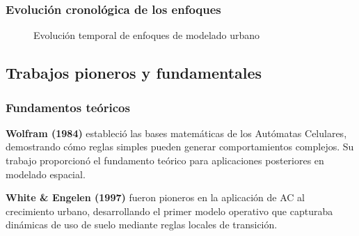 \subsubsection{Evolución cronológica de los enfoques}

\begin{figure}[h]
\centering
{}
\caption{Evolución temporal de enfoques de modelado urbano}
\label{fig:evolution_timeline}
\end{figure}

\subsection{Trabajos pioneros y fundamentales}

\subsubsection{Fundamentos teóricos}

\textbf{Wolfram (1984)} estableció las bases matemáticas de los Autómatas Celulares, demostrando cómo reglas simples pueden generar comportamientos complejos. Su trabajo proporcionó el fundamento teórico para aplicaciones posteriores en modelado espacial.

\textbf{White \& Engelen (1997)} fueron pioneros en la aplicación de AC al crecimiento urbano, desarrollando el primer modelo operativo que capturaba dinámicas de uso de suelo mediante reglas locales de transición.

